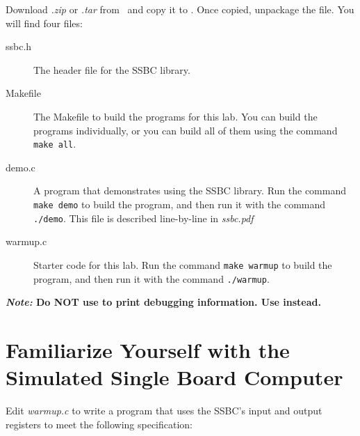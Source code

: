 Download \textit{\shortlabname.zip} or \textit{\shortlabname.tar} from
\filesource\ and copy it to \runtimeenvironment. Once copied, unpackage the
file. You will find four files:
\begin{description}
    \item [ssbc.h] The header file for the SSBC library.
    \item [Makefile] The Makefile to build the programs for this lab. You can build the programs individually, or you can build all of them using the command \texttt{make all}.
    \item [demo.c] A program that demonstrates using the SSBC library. Run the
        command \texttt{make demo} to build the program, and then run it with
        the command \texttt{./demo}. This file is described line-by-line in
        \textit{ssbc.pdf}
    \item [warmup.c] Starter code for this lab. Run the command \texttt{make
        warmup} to build the program, and then run it with the command
        \texttt{./warmup}.
\end{description}

\textbf{\textit{Note: }Do NOT use  to print debugging
information. Use  instead.}

\section{Familiarize Yourself with the Simulated Single Board Computer}

Edit \textit{warmup.c} to write a program that uses the SSBC's input and output
registers to meet the following specification:

